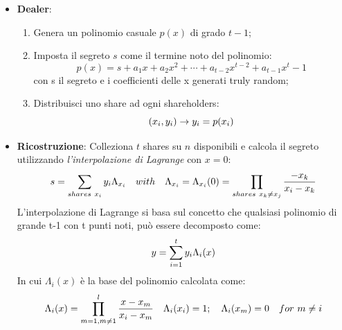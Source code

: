 \documentclass{book}
\begin{document}
\begin{itemize}
    \item \textbf{Dealer}:\
          \begin{enumerate}
              \item Genera un polinomio casuale \(p(x)\) di grado \(t-1\);
              \item Imposta il segreto \(s\) come il termine noto del polinomio:
                    \begin{equation*}
                        p(x)=s+a_{1}x+a_{2}x^{2}+ \cdots +a_{t-2}x^{t-2}+a_{t-1}x^t-1
                    \end{equation*}
                    con s il segreto e i coefficienti delle x generati truly random;
              \item Distribuisci uno share ad ogni shareholders:
                    \begin{equation*}
                        \centering
                        (x_{i},y_{i})\rightarrow y_{i}=p(x_{i})
                    \end{equation*}
          \end{enumerate}
    \item \textbf{Ricostruzione}: Colleziona \(t\) shares su \(n\) disponibili e calcola il segreto utilizzando \emph{l'interpolazione di Lagrange} con \(x=0\):
          \begin{equation*}
              \centering
              s=\sum_{shares\ x_i}{y_{i}\Lambda_{x_{i}}}\quad with\quad\Lambda_{x_{i}}=\Lambda_{x_{i}}(0)=\prod_{shares\ x_{k}\neq x_{j}}{\frac{-x_{k}}{x_{i}-x_{k}}}
          \end{equation*}
          L'interpolazione di Lagrange si basa sul concetto che qualsiasi polinomio di grande t-1 con t punti noti, può essere decomposto come:
          \begin{equation*}
              \centering
              y=\sum_{i=1}^{t}{y_{i}\Lambda_{i}(x)}
          \end{equation*}
          In cui \(\Lambda_{i}(x)\) è la base del polinomio calcolata come:
          \begin{equation*}
              \centering
              \Lambda_{i}(x)=\prod_{m=1,m\neq1}^{l}{\frac{x-x_{m}}{x_{i}-x_{m}}}\quad \Lambda_{i}(x_{i})=1;\quad \Lambda_{i}(x_{m})=0\quad for\ m\neq i
          \end{equation*}
\end{itemize}
\end{document}
